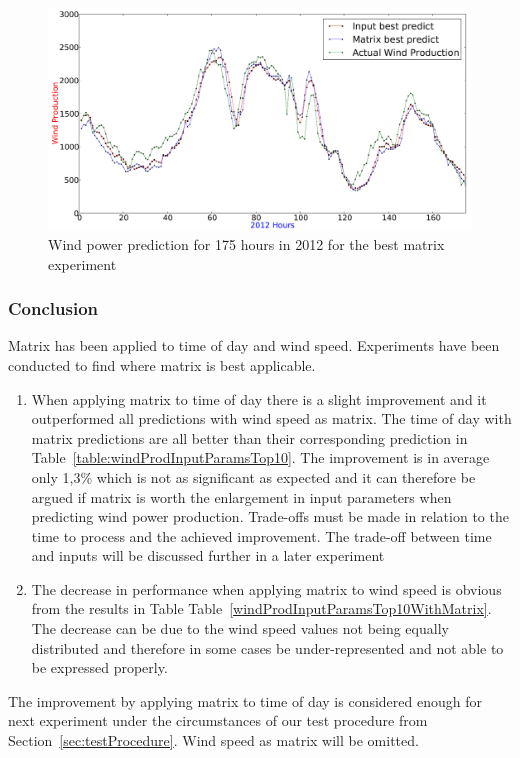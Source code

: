 \begin{figure}[H]
\centering
\includegraphics[width=0.99\linewidth]{billeder/bestMatrixGraph.png}
\caption{Wind power prediction for 175 hours in 2012 for the best matrix experiment}
\label{fig:bestMatrixGraph}
\end{figure}   

\subsubsection{Conclusion}
Matrix has been applied to time of day and wind speed. Experiments have been conducted to find where matrix is best applicable.

\begin{enumerate}
\item When applying matrix to time of day there is a slight improvement and it outperformed all predictions with wind speed as matrix. The time of day with matrix predictions are all better than their corresponding prediction in Table~\ref{table:windProdInputParamsTop10}. The improvement is in average only 1,3\% which is not as significant as expected and it can therefore be argued if matrix is worth the enlargement in input parameters when predicting wind power production. Trade-offs must be made in relation to the time to process and the achieved improvement. The trade-off between time and inputs will be discussed further in a later experiment 
\item The decrease in performance when applying matrix to wind speed is obvious from the results in Table Table~\ref{windProdInputParamsTop10WithMatrix}. The decrease can be due to the wind speed values not being equally distributed and therefore in some cases be under-represented and not able to be expressed properly.  
\end{enumerate}

The improvement by applying matrix to time of day is considered enough for next experiment under the circumstances of our test procedure from Section~\ref{sec:testProcedure}. Wind speed as matrix will be omitted.

